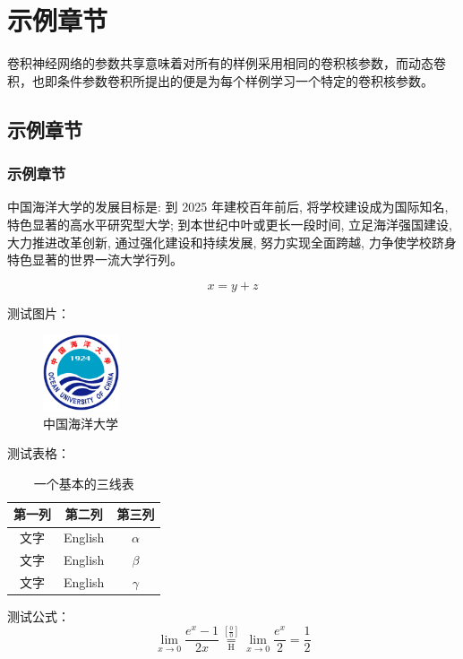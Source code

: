 \section{示例章节}
卷积神经网络的参数共享意味着对所有的样例采用相同的卷积核参数，而动态卷积，也即条件参数卷积所提出的便是为每个样例学习一个特定的卷积核参数。
\subsection{示例章节}
\subsubsection{示例章节}{
中国海洋大学的发展目标是: 到 2025 年建校百年前后, 将学校建设成为国际知名, 特色显著的高水平研究型大学; 到本世纪中叶或更长一段时间, 立足海洋强国建设, 大力推进改革创新, 通过强化建设和持续发展, 努力实现全面跨越, 力争使学校跻身特色显著的世界一流大学行列。
}

\begin{equation}
    x = y+z
\end{equation}

测试图片：
\begin{figure}[!htbp]
    \centering
    \includegraphics[width = 0.2\textwidth]{assets/logo}
    \caption{中国海洋大学}
    \label{fig:ouc1}
\end{figure}

测试表格：
\begin{table}[!htbp]
\centering
\caption{一个基本的三线表}
\begin{tabular*}{350pt}{@{\extracolsep{\fill}}ccc}
\toprule
第一列 & 第二列 & 第三列 \\
\midrule
文字 & English & $\alpha$ \\
文字 & English & $\beta$ \\
文字 & English & $\gamma$\\
\bottomrule
\end{tabular*}
\end{table}

测试公式：
\begin{equation}
 \lim_{x\to 0}{\frac{e^x-1}{2x}}
 \overset{\left[\frac{0}{0}\right]}{\underset{\mathrm{H}}{=}}
 \lim_{x\to 0}{\frac{e^x}{2}}={\frac{1}{2}}
\end{equation}
\newpage